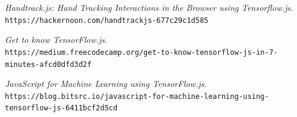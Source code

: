 \documentclass{VUMIFInfKursinis}
\begin{document}
\begin{thebibliography}{9}
\textit{Handtrack.js: Hand Tracking Interactions in the Browser using Tensorflow.js}.
\\\texttt{https://hackernoon.com/handtrackjs-677c29c1d585}

\textit{Get to know TensorFlow.js}.
\\\texttt{https://medium.freecodecamp.org/get-to-know-tensorflow-js-in-7-minutes-afcd0dfd3d2f}

\textit{JavaScript for Machine Learning using TensorFlow.js}.
\\\texttt{https://blog.bitsrc.io/javascript-for-machine-learning-using-tensorflow-js-6411bcf2d5cd}

\end{thebibliography}
\end{document}
